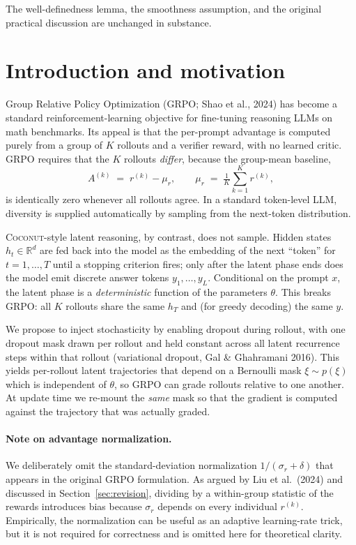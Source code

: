 \documentclass[11pt]{article}
\theoremstyle{definition}
\theoremstyle{remark}
\newcommand{\R}{\mathbb{R}}
\begin{document}
The well-definedness lemma, the smoothness assumption, and the original
practical discussion are unchanged in substance.

\section{Introduction and motivation}

Group Relative Policy Optimization (GRPO; Shao et al., 2024) has become a
standard reinforcement-learning objective for fine-tuning reasoning LLMs on
math benchmarks.  Its appeal is that the per-prompt advantage is computed
purely from a group of $K$ rollouts and a verifier reward, with no learned
critic.  GRPO requires that the $K$ rollouts \emph{differ}, because the
group-mean baseline,
\begin{equation}
A^{(k)} \;=\; r^{(k)} - \mu_r,
\qquad
\mu_r \;=\; \tfrac1K\sum_{k=1}^{K} r^{(k)},
\label{eq:grpo-advantage}
\end{equation}
is identically zero whenever all rollouts agree.  In a standard token-level
LLM, diversity is supplied automatically by sampling from the next-token
distribution.

\textsc{Coconut}-style latent reasoning, by contrast, does not sample.  Hidden
states $h_t \in \R^d$ are fed back into the model as the embedding of the next
``token'' for $t = 1, \dots, T$ until a stopping criterion fires; only after
the latent phase ends does the model emit discrete answer tokens
$y_1, \dots, y_L$.  Conditional on the prompt $x$, the latent phase is a
\emph{deterministic} function of the parameters $\theta$.  This breaks GRPO:
all $K$ rollouts share the same $h_T$ and (for greedy decoding) the same $y$.

We propose to inject stochasticity by enabling dropout during rollout, with
one dropout mask drawn per rollout and held constant across all latent
recurrence steps within that rollout (variational dropout, Gal \& Ghahramani
2016).  This yields per-rollout latent trajectories that depend on a
Bernoulli mask $\xi \sim p(\xi)$ which is independent of $\theta$, so GRPO
can grade rollouts relative to one another.  At update time we re-mount the
\emph{same} mask so that the gradient is computed against the trajectory
that was actually graded.

\paragraph{Note on advantage normalization.}
We deliberately omit the standard-deviation normalization
$1/(\sigma_r + \delta)$ that appears in the original GRPO formulation.  As
argued by Liu et al.\ (2024) and discussed in Section~\ref{sec:revision},
dividing by a within-group statistic of the rewards introduces bias because
$\sigma_r$ depends on every individual $r^{(k)}$.  Empirically, the
normalization can be useful as an adaptive learning-rate trick, but it is
not required for correctness and is omitted here for theoretical clarity.
\end{document}
